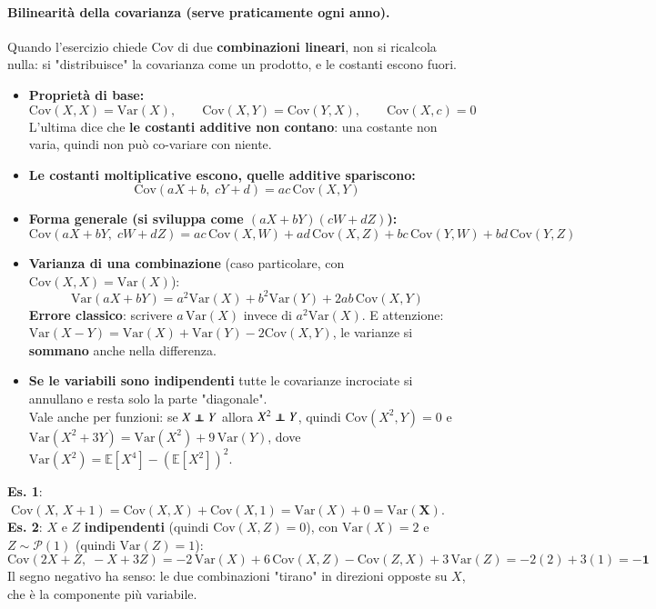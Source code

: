 \documentclass[12pt]{extarticle} %
\newcommand\independent{\protect\mathpalette{\protect\independenT}{\perp}}
\def\independenT#1#2{\mathrel{\rlap{$#1#2$}\mkern2mu{#1#2}}}
\begin{document}
\paragraph{Bilinearità della covarianza (serve praticamente ogni anno).} Quando l'esercizio chiede $\mathrm{Cov}$ di due \textbf{combinazioni lineari}, non si ricalcola nulla: si "distribuisce" la covarianza come un prodotto, e le costanti escono fuori.
\begin{itemize}
    \item \textbf{Proprietà di base:}
    $$ \mathrm{Cov}(X,X) = \mathrm{Var}(X), \qquad \mathrm{Cov}(X,Y) = \mathrm{Cov}(Y,X), \qquad \mathrm{Cov}(X, c) = 0 $$
    {\footnotesize L'ultima dice che \textbf{le costanti additive non contano}: una costante non varia, quindi non può co-variare con niente.}
    \item \textbf{Le costanti moltiplicative escono, quelle additive spariscono:}
    $$ \boxed{\;\mathrm{Cov}(aX + b,\; cY + d) = ac\,\mathrm{Cov}(X,Y)\;} $$
    \item \textbf{Forma generale (si sviluppa come $(aX+bY)(cW+dZ)$):}
    $$ \mathrm{Cov}(aX + bY,\; cW + dZ) = ac\,\mathrm{Cov}(X,W) + ad\,\mathrm{Cov}(X,Z) + bc\,\mathrm{Cov}(Y,W) + bd\,\mathrm{Cov}(Y,Z) $$
    \item \textbf{Varianza di una combinazione} (caso particolare, con $\mathrm{Cov}(X,X)=\mathrm{Var}(X)$):
    $$ \mathrm{Var}(aX + bY) = a^2\mathrm{Var}(X) + b^2\mathrm{Var}(Y) + 2ab\,\mathrm{Cov}(X,Y) $$
    {\footnotesize \textbf{Errore classico}: scrivere $a\,\mathrm{Var}(X)$ invece di $a^2\mathrm{Var}(X)$. E attenzione: $\mathrm{Var}(X - Y) = \mathrm{Var}(X)+\mathrm{Var}(Y) - 2\mathrm{Cov}(X,Y)$, le varianze si \textbf{sommano} anche nella differenza.}
    \item \textbf{Se le variabili sono indipendenti} tutte le covarianze incrociate si annullano e resta solo la parte "diagonale". \\ {\footnotesize Vale anche per funzioni: se $X \independent Y$ allora $X^2 \independent Y$, quindi $\mathrm{Cov}(X^2, Y) = 0$ e $\mathrm{Var}(X^2 + 3Y) = \mathrm{Var}(X^2) + 9\,\mathrm{Var}(Y)$, dove $\mathrm{Var}(X^2) = \mathbb{E}[X^4] - (\mathbb{E}[X^2])^2$.}
\end{itemize}
{\footnotesize \textbf{Es. 1}: $\;\mathrm{Cov}(X,\, X+1) = \mathrm{Cov}(X,X) + \mathrm{Cov}(X,1) = \mathrm{Var}(X) + 0 = \mathbf{\mathrm{Var}(X)}$. \\
\textbf{Es. 2}: $X$ e $Z$ \textbf{indipendenti} (quindi $\mathrm{Cov}(X,Z)=0$), con $\mathrm{Var}(X) = 2$ e $Z \sim \mathcal{P}(1)$ (quindi $\mathrm{Var}(Z) = 1$):
$$ \mathrm{Cov}(2X + Z,\; -X + 3Z) = -2\,\mathrm{Var}(X) + 6\,\mathrm{Cov}(X,Z) - \mathrm{Cov}(Z,X) + 3\,\mathrm{Var}(Z) = -2(2) + 3(1) = \mathbf{-1} $$
Il segno negativo ha senso: le due combinazioni "tirano" in direzioni opposte su $X$, che è la componente più variabile.}
\end{document}
